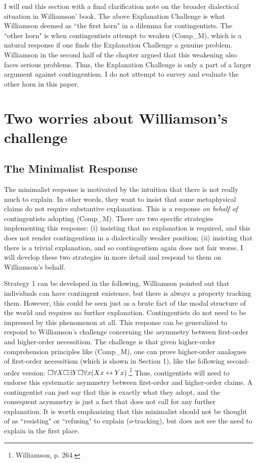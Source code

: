I will end this section with a final clarification note on the broader dialectical situation in Williamson' book. The above Explanation Challenge is what Williamson deemed as ``the first horn" in a dilemma for contingentists. The ``other horn" is when contingentists attempt to weaken (Comp_M), which is a natural response if one finds the Explanation Challenge a genuine problem. Williamson in the second half of the chapter argued that this weakening also faces serious problems. Thus, the Explanation Challenge is only a part of a larger argument against contingentism. I do not attempt to survey and evaluate the other horn in this paper. 

\section{Two worries about Williamson's challenge}
\subsection{The Minimalist Response}
The minimalist response is motivated by the intuition that there is not really much to explain. In other words, they want to insist that some metaphysical claims do not require substantive explanation. This is a response \emph{on behalf of} contingentists adopting (Comp_M). 
There are two specific strategies implementing this response: (i) insisting that no explanation is required, and this does not render contingentism in a dialectically weaker position; (ii) insisting that there is a trivial explanation, and so contingentism again does not fair worse. I will develop these two strategies in more detail and respond to them on Williamson's behalf. 

Strategy 1 can be developed in the following, Williamson pointed out that individuals can have contingent existence, but there is always a property tracking them. However, this could be seen just as a brute fact of the modal structure of the world and requires no further explanation. Contingentists do not need to be impressed by this phenomenon at all. This response can be generalized to respond to Williamson's challenge concerning the asymmetry between first-order and higher-order necessitism. The challenge is that given higher-order comprehension principles like (Comp_M), one can prove higher-order analogues of first-order necessitism (which is shown in Section 1), like the following second-order version: $\Box \forall X \Box \exists Y \Box \forall x (Xx \leftrightarrow Yx)$.\footnote{Williamson, p. 264.} Thus, contigentists will need to endorse this systematic asymmetry between first-order and higher-order claims.  
A contingentist can just say that this is exactly what they adopt, and the consequent asymmetry is just a fact that does not call for any further explanation. It is worth emphasizing that this minimalist should not be thought of as ``resisting" or ``refusing" to explain ($o$-tracking), but does not see the need to explain in the first place. 

